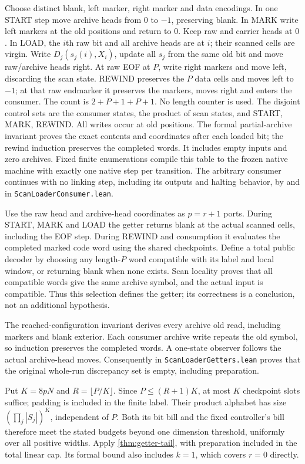 \begin{outline}
Choose distinct blank, left marker, right marker and data encodings. In one
START step move archive heads from $0$ to $-1$, preserving blank. In MARK
write left markers at the old positions and return to $0$. Keep raw and
carrier heads at $0$. In LOAD, the $i$th raw bit and all archive heads
are at $i$; their scanned cells are virgin. Write $D_j(s_j(i),X_i)$,
update all $s_j$ from the same old bit and move raw/archive heads right.
At raw EOF at $P$, write right markers and move left, discarding the scan
state. REWIND preserves the $P$ data cells and moves left to $-1$; at
that raw endmarker it preserves the markers, moves right and enters the consumer.
The count is $2+P+1+P+1$. No length counter is used. The disjoint control
sets are the consumer states, the product of scan states, and START, MARK,
REWIND. All writes occur at old positions. The formal partial-archive
invariant proves the exact contents and coordinates after each loaded bit;
the rewind induction preserves the completed words. It includes empty
inputs and zero archives. Fixed finite enumerations compile this table to
the frozen native machine with exactly one native step per transition.
The arbitrary consumer continues with no linking step, including its outputs
and halting behavior, by  and
 in \texttt{ScanLoaderConsumer.lean}.

Use the raw head and archive-head coordinates as $p=r+1$ ports. During
START, MARK and LOAD the getter returns blank at the actual scanned cells,
including the EOF step. During REWIND and consumption it evaluates the
completed marked code word using the shared checkpoints. Define a total
public decoder by choosing any length-$P$ word compatible with its label and
local window, or returning blank when none exists. Scan locality proves that
all compatible words give the same archive symbol, and the actual input is
compatible. Thus this selection defines the getter; its correctness is a
conclusion, not an additional hypothesis.

The reached-configuration invariant derives every archive old read,
including markers and blank exterior. Each consumer archive write repeats
the old symbol, so induction preserves the completed words. A one-state
observer follows the actual archive-head moves. Consequently
 in
\texttt{ScanLoaderGetters.lean} proves that the original whole-run
discrepancy set is empty, including preparation.

Put $K=8pN$ and $R=\lfloor P/K\rfloor$. Since $P\le(R+1)K$, at most
$K$ checkpoint slots suffice; padding is included in the finite label.
Their product alphabet has size $(\prod_j|S_j|)^K$, independent of $P$.
Both its bit bill and the fixed controller's bill therefore meet the stated
budgets beyond one dimension threshold, uniformly over all positive widths.
Apply \cref{thm:getter-tail}, with preparation included in the total linear
cap. Its formal bound also includes $k=1$, which covers $r=0$ directly.
\end{outline}

